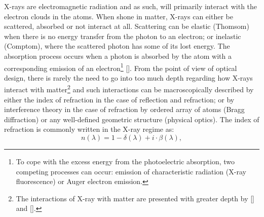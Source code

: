 \begin{refsection}
X-rays are electromagnetic radiation and as such, will primarily interact with the electron clouds in the atoms. When shone in matter, X-rays can either be scattered, absorbed or not interact at all. Scattering can be elastic (Thomsom) when there is no energy transfer from the photon to an electron; or inelastic (Comptom), where the scattered photon has some of its lost energy. The absorption process occurs when a photon is absorbed by the atom with a corresponding emission of an electron\footnote{To cope with the excess energy from the photoelectric absorption, two competing processes can occur: emission of characteristic radiation (X-ray fluorescence) or Auger electron emission.} [\cite[\textit{§1.2}-\textit{§1.3}]{Als-Nielsen2011}]. From the point of view of optical design, there is rarely the need to go into too much depth regarding how X-rays interact with matter\footnote{The interactions of X-ray with matter are presented with greater depth by [\cite[\textit{§1}]{Als-Nielsen2011}] and [\cite[\textit{§1} - \textit{§3}]{Attwood2016}].} and such interactions can be macroscopically described by either the index of refraction in the case of reflection and refraction; or by interference theory in the case of refraction by ordered array of atoms (Bragg diffraction) or any well-defined geometric structure (physical optics). The index of refraction is commonly written in the X-ray regime as:
\begin{equation}
    n(\lambda)=1-\delta(\lambda)+i\cdot\beta(\lambda),
\end{equation}

\end{refsection}
